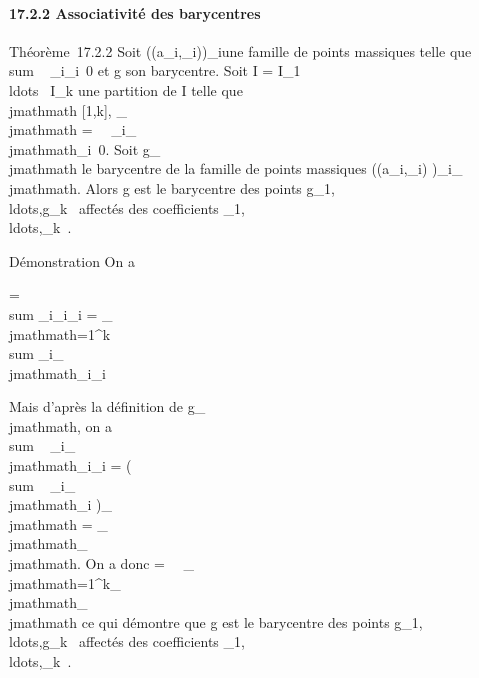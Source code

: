 \documentclass[]{article}
\begin{document}
\paragraph{17.2.2 Associativité des barycentres}

Théorème~17.2.2 Soit \left
((a_i,\lambda_i)\right )_i\inI une
famille de points massiques telle que
\\sum ~
_i\inI\lambda_i\neq~0 et g son
barycentre. Soit I = I_1
\cup\\ldots~ \cup
I_k une partition de I telle que \forall~~\\jmathmath \in
{[}1,k{]}, \mu_\\jmathmath =\
\sum ~
_i\inI_\\jmathmath\lambda_i\neq~0. Soit
g_\\jmathmath le barycentre de la famille de points massiques
\left ((a_i,\lambda_i)\right
)_i\inI_\\jmathmath. Alors g est le barycentre des points
g_1,\\ldots,g_k~
affectés des coefficients
\mu_1,\\ldots,\mu_k~.

Démonstration On a

 = \\sum
_i\inI\lambda_i\overrightarrowga_i
= \sum _\\jmathmath=1^k~
\\sum
_i\inI_\\jmathmath\lambda_i\overrightarrowga_i

Mais d'après la définition de g_\\jmathmath, on a
\\sum ~
_i\inI_\\jmathmath\lambda_i\overrightarrowga_i
= \left
(\\sum ~
_i\inI_\\jmathmath\lambda_i\right
)\overrightarrowgg_\\jmathmath =
\mu_\\jmathmath\overrightarrowgg_\\jmathmath. On a donc
 =\
\sum ~
_\\jmathmath=1^k\mu_\\jmathmath\overrightarrowgg_\\jmathmath
ce qui démontre que g est le barycentre des points
g_1,\\ldots,g_k~
affectés des coefficients
\mu_1,\\ldots,\mu_k~.
\end{document}
